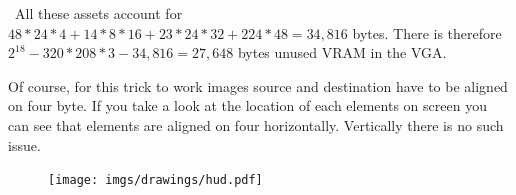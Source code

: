     \begin{minipage}{.3\textwidth}
  \end{minipage}
\begin{minipage}{.3\textwidth}
  \end{minipage}
\begin{minipage}{.3\textwidth}
  \end{minipage}
\par

    \begin{minipage}{.3\textwidth}
  \end{minipage}
\begin{minipage}{.3\textwidth}
  \end{minipage}
\begin{minipage}{.3\textwidth}
  \end{minipage}
\par


\begin{minipage}{.1\textwidth}
  \end{minipage}
\begin{minipage}{.1\textwidth}
  \end{minipage}
\begin{minipage}{.1\textwidth}
  \end{minipage}
\begin{minipage}{.1\textwidth}
  \end{minipage}
  \begin{minipage}{.3\textwidth}
  \end{minipage}
\begin{minipage}{.3\textwidth}
  \end{minipage}\
All these assets account for $48*24*4+14*8*16+23*24*32+224*48=34,816$ bytes. There is therefore $2^18-320*208*3 - 34,816=27,648$ bytes unused VRAM in the VGA.\\
\par
Of course, for this trick to work images source and destination have to be aligned on four byte. If you take a look at the location of each elements on screen you can see that elements are aligned on four horizontally. Vertically there is no such issue.
\begin{figure}[H]
  \centering
 \texttt{[image: imgs/drawings/hud.pdf]}
\end{figure}


